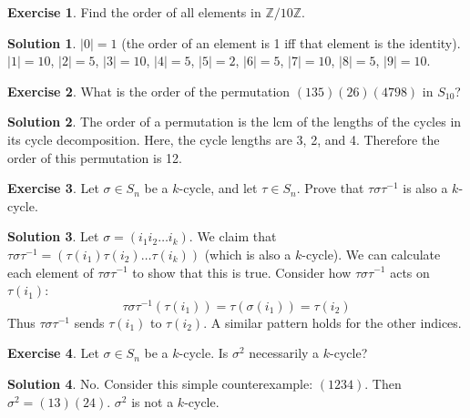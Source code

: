 \documentclass[12pt]{article}
\theoremstyle{definition}
\newcommand{\Z}{\mathbb{Z}}
\newtheorem{exercise}{\color{YellowOrange}Exercise}
\theoremstyle{definition}
\newtheorem{solution}{\color{Goldenrod}Solution}
\begin{document}
\begin{exercise}
Find the order of all elements in $\Z / 10 \Z$.
\end{exercise}
\begin{solution}
$|0| = 1$ (the order of an element is 1 iff that element is the identity). $|1| = 10$, $|2| = 5$, $|3| = 10$, $|4| = 5$, $|5|=2$, $|6| = 5$, $|7|=10$, $|8|=5$, $|9|=10$.
\end{solution}

\begin{exercise}
What is the order of the permutation $(1 3 5)(2 6)(4 7 9 8)$ in $S_{10}$?
\end{exercise}
\begin{solution}
The order of a permutation is the lcm of the lengths of the cycles in its cycle decomposition. Here, the cycle lengths are 3, 2, and 4. Therefore the order of this permutation is 12.
\end{solution}

\begin{exercise}
Let $\sigma \in S_n$ be a $k$-cycle, and let $\tau \in S_n$. Prove that $\tau \sigma \tau^{-1}$ is also a $k$-cycle.
\end{exercise}
\begin{solution}
Let $\sigma = (i_1 i_2 \ldots i_k)$. We claim that $\tau \sigma \tau^{-1} = (\tau(i_1) \tau(i_2) \ldots \tau(i_k))$ (which is also a $k$-cycle). We can calculate each element of $\tau \sigma \tau^{-1}$ to show that this is true. Consider how $\tau \sigma \tau^{-1}$ acts on $\tau(i_1)$:
\begin{equation}
	\tau \sigma \tau^{-1}(\tau(i_1)) = \tau(\sigma(i_1)) = \tau(i_2)
\end{equation}
Thus $\tau \sigma \tau^{-1}$ sends $\tau(i_1)$ to $\tau(i_2)$. A similar pattern holds for the other indices. 
\end{solution}

\begin{exercise}
Let $\sigma \in S_n$ be a $k$-cycle. Is $\sigma^2$ necessarily a $k$-cycle?
\end{exercise}
\begin{solution}
No. Consider this simple counterexample: $(1 2 3 4)$. Then $\sigma^2 = (1 3) (2 4)$. $\sigma^2$ is not a $k$-cycle.
\end{solution}
\end{document}
